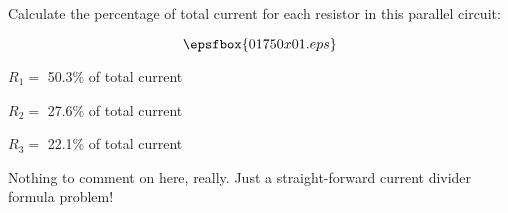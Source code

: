 

Calculate the percentage of total current for each resistor in this parallel circuit:

$$\epsfbox{01750x01.eps}$$







$R_1 = $ 50.3\% of total current

$R_2 = $ 27.6\% of total current

$R_3 = $ 22.1\% of total current







Nothing to comment on here, really.  Just a straight-forward current divider formula problem!




